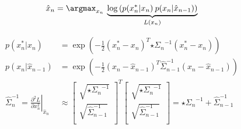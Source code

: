 \begin{algorithm}
\begin{equation*}
\begin{aligned}
\hat{x}_n &= \argmax_{x_n} \: \underbrace{\log \left( p(x_n^*|x_n) \: p(x_n |\hat{x}_{n - 1}) \right)}_{L(x_n)}    
\\
\end{aligned}
\end{equation*}

\begin{equation*}
\begin{aligned}
p(x_n^* | x_n) &= \exp \left( -\tfrac{1}{2}(x_n^* - x_n )^T {\star{\Sigma}_n}^{-1}(x_n^* - x_n )\right)
\\
p(x_n |\hat{x}_{n - 1}) &= 
\exp \left( -\tfrac{1}{2} (x_n - \hat{x}_{n - 1} )^T \hat{\Sigma}_{n - 1}^{-1} (x_n - \hat{x}_{n - 1} )\right)
\\
\hat{\Sigma}_n^{-1} = 
\left.\tfrac{\partial^2 L}{\partial x_n^2}\right|_{\hat{x}_n} &\approx 
\left[
    \begin{array}{cc}
        \sqrt{{\star{\Sigma}_n}^{-1}} \\
        \sqrt{\hat{\Sigma}_{n - 1}^{-1}} \\
    \end{array}
\right]^T
\left[
    \begin{array}{c}
        \sqrt{{\star{\Sigma}_n}^{-1}} \\
        \sqrt{\hat{\Sigma}_{n - 1}^{-1}} \\
    \end{array}
\right]
= {\star{\Sigma}_n}^{-1} + \hat{\Sigma}_{n-1}^{-1}
\end{aligned}
\end{equation*}
\caption{
% 
% 
\emph{Split} cumulative regression -- Kalman Filter (KF)
% 
% 
}
\label{tab:interframe}
\label{tab:kf-like}
\end{algorithm}